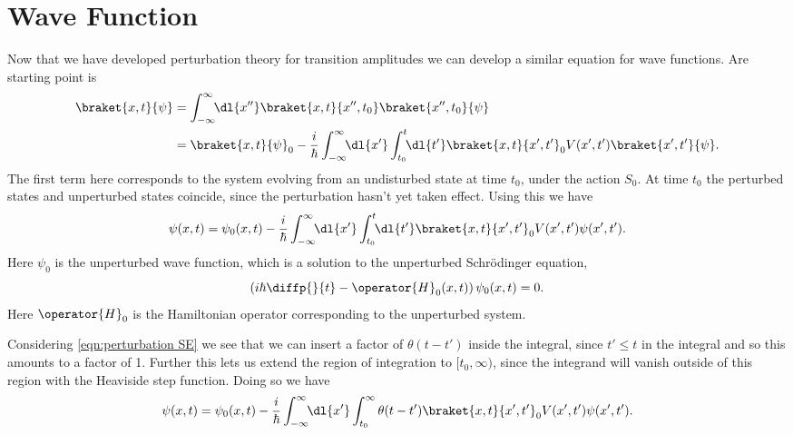 \documentclass[fleqn]{NotesClass}
\newcommand*{\hamiltonian}{H}
\begin{document}
    \section{Wave Function}
    Now that we have developed perturbation theory for transition amplitudes we can develop a similar equation for wave functions.
    Are starting point is
    \begin{align}
        \braket{x, t}{\psi} &= \int_{-\infty}^{\infty} \!\! \dl{x''} \braket{x, t}{x'', t_0} \braket{x'', t_0}{\psi}\\
        &= \braket{x, t}{\psi}_{0} - \frac{i}{\hbar} \int_{-\infty}^{\infty} \!\! \dl{x'} \int_{t_0}^{t} \!\! \dl{t'} \braket{x, t}{x', t'}_0 V(x', t') \braket{x', t'}{\psi}.
    \end{align}
    The first term here corresponds to the system evolving from an undisturbed state at time \(t_0\), under the action \(S_0\).
    At time \(t_0\) the perturbed states and unperturbed states coincide, since the perturbation hasn't yet taken effect.
    Using this we have
    \begin{equation}\label{eqn:perturbation SE}
        \psi(x, t) = \psi_0(x, t) - \frac{i}{\hbar} \int_{-\infty}^{\infty} \!\! \dl{x'} \int_{t_0}^{t} \!\! \dl{t'} \braket{x, t}{x', t'}_0 V(x', t') \psi(x', t').
    \end{equation}
    Here \(\psi_0\) is the unperturbed wave function, which is a solution to the unperturbed Schr\"odinger equation,
    \begin{equation}
        \left( i\hbar\diffp{}{t} - \operator{\hamiltonian}_0(x, t) \right) \psi_0(x, t) = 0.
    \end{equation}
    Here \(\operator{\hamiltonian}_0\) is the Hamiltonian operator corresponding to the unperturbed system.
    
    Considering \cref{eqn:perturbation SE} we see that we can insert a factor of \(\theta(t - t')\) inside the integral, since \(t' \le t\) in the integral and so this amounts to a factor of 1.
    Further this lets us extend the region of integration to \([t_0, \infty)\), since the integrand will vanish outside of this region with the Heaviside step function.
    Doing so we have
    \begin{equation}
        \psi(x, t) = \psi_0(x, t) - \frac{i}{\hbar} \int_{-\infty}^{\infty} \!\! \dl{x'} \int_{t_0}^{\infty} \theta(t - t') \braket{x, t}{x', t'}_0 V(x', t') \psi(x', t').
    \end{equation}
    
\end{document}
